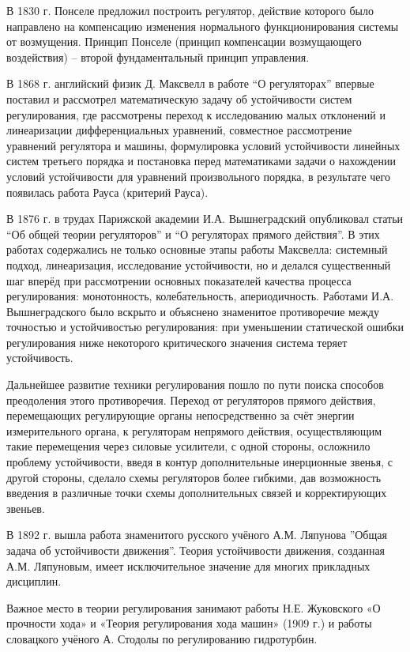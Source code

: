 \documentclass[14pt,a4paper,report]{report}
\begin{document}
В 1830 г. Понселе предложил построить регулятор, действие которого было направлено на компенсацию изменения нормального функционирования системы от возмущения. Принцип Понселе (принцип компенсации возмущающего воздействия) – второй фундаментальный принцип управления.

В 1868 г. английский физик Д. Максвелл в работе “О регуляторах” впервые поставил и рассмотрел математическую задачу об устойчивости систем регулирования, где рассмотрены переход к исследованию малых отклонений и линеаризации дифференциальных уравнений, совместное рассмотрение уравнений регулятора и машины, формулировка условий устойчивости линейных систем третьего порядка и постановка перед математиками задачи о нахождении условий устойчивости для уравнений произвольного порядка, в результате чего появилась работа Рауса (критерий Рауса).

В 1876 г. в трудах Парижской академии И.А. Вышнеградский опубликовал статьи “Об общей теории регуляторов” и “О регуляторах прямого действия”. В этих работах содержались не только основные этапы работы Максвелла: системный подход, линеаризация, исследование устойчивости, но и делался существенный шаг вперёд при рассмотрении основных показателей качества процесса регулирования: монотонность, колебательность, апериодичность. Работами И.А. Вышнеградского было вскрыто и объяснено знаменитое противоречие между точностью и устойчивостью регулирования: при уменьшении статической ошибки регулирования ниже некоторого критического значения система теряет устойчивость.

Дальнейшее развитие техники регулирования пошло по пути поиска способов преодоления этого противоречия. Переход от регуляторов прямого действия, перемещающих регулирующие органы непосредственно за счёт энергии измерительного органа, к регуляторам непрямого действия, осуществляющим такие перемещения через силовые усилители, с одной стороны, осложнило проблему устойчивости, введя в контур дополнительные инерционные звенья, с другой стороны, сделало схемы регуляторов более гибкими, дав возможность введения в различные точки схемы дополнительных связей и корректирующих звеньев.

В 1892 г. вышла работа знаменитого русского учёного А.М. Ляпунова ”Общая задача об устойчивости движения”. Теория устойчивости движения, созданная А.М. Ляпуновым, имеет исключительное значение для многих прикладных дисциплин.

Важное место в теории регулирования занимают работы Н.Е. Жуковского «О прочности хода» и «Теория регулирования хода машин» (1909 г.) и работы словацкого учёного А. Стодолы по регулированию гидротурбин.
\end{document}
